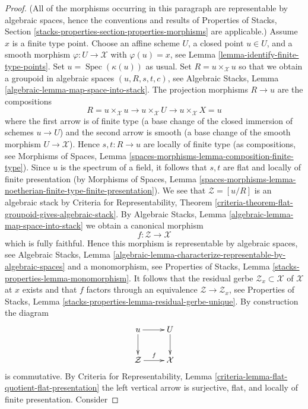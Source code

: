 \documentclass[10pt,a4paper]{amsart}
\theoremstyle{plain}
\theoremstyle{definition}
\theoremstyle{remark}
\numberwithin{equation}{subsection}
\def\Spec{\mathop{\mathrm{Spec}}}
\begin{document}
\begin{proof}
(All of the morphisms occurring in this paragraph are representable
by algebraic spaces, hence the conventions and results of
Properties of Stacks,
Section \ref{stacks-properties-section-properties-morphisms}
are applicable.)
Assume $x$ is a finite type point. Choose an affine scheme $U$,
a closed point $u \in U$, and a smooth morphism $\varphi : U \to \mathcal{X}$
with $\varphi(u) = x$, see
Lemma \ref{lemma-identify-finite-type-points}.
Set $u = \Spec(\kappa(u))$ as usual. Set $R = u \times_\mathcal{X} u$
so that we obtain a groupoid in algebraic spaces
$(u, R, s, t, c)$, see
Algebraic Stacks, Lemma \ref{algebraic-lemma-map-space-into-stack}.
The projection morphisms $R \to u$ are the compositions
$$
R = u \times_\mathcal{X} u \to
u \times_\mathcal{X} U \to
u \times_\mathcal{X} X = u
$$
where the first arrow is of finite type (a base change of the closed
immersion of schemes $u \to U$) and the second arrow is smooth (a base
change of the smooth morphism $U \to \mathcal{X}$). Hence
$s, t : R \to u$ are locally of finite type (as compositions, see
Morphisms of Spaces,
Lemma \ref{spaces-morphisms-lemma-composition-finite-type}).
Since $u$ is the spectrum of a field, it follows that
$s, t$ are flat and locally of finite presentation (by
Morphisms of Spaces, Lemma
\ref{spaces-morphisms-lemma-noetherian-finite-type-finite-presentation}).
We see that $\mathcal{Z} = [u/R]$ is an algebraic stack by
Criteria for Representability,
Theorem \ref{criteria-theorem-flat-groupoid-gives-algebraic-stack}.
By
Algebraic Stacks, Lemma \ref{algebraic-lemma-map-space-into-stack}
we obtain a canonical morphism
$$
f : \mathcal{Z} \longrightarrow \mathcal{X}
$$
which is fully faithful. Hence this morphism is representable by
algebraic spaces, see
Algebraic Stacks, Lemma
\ref{algebraic-lemma-characterize-representable-by-algebraic-spaces}
and a monomorphism, see
Properties of Stacks, Lemma \ref{stacks-properties-lemma-monomorphism}.
It follows that the residual gerbe $\mathcal{Z}_x \subset \mathcal{X}$
of $\mathcal{X}$ at $x$ exists and that $f$ factors through an
equivalence $\mathcal{Z} \to \mathcal{Z}_x$, see
Properties of Stacks, Lemma
\ref{stacks-properties-lemma-residual-gerbe-unique}.
By construction the diagram
$$
\xymatrix{
u \ar[d] \ar[r] & U \ar[d] \\
\mathcal{Z} \ar[r]^f & \mathcal{X}
}
$$
is commutative. By
Criteria for Representability,
Lemma \ref{criteria-lemma-flat-quotient-flat-presentation}
the left vertical arrow is surjective, flat, and locally of finite
presentation. Consider

\end{proof}
\end{document}
